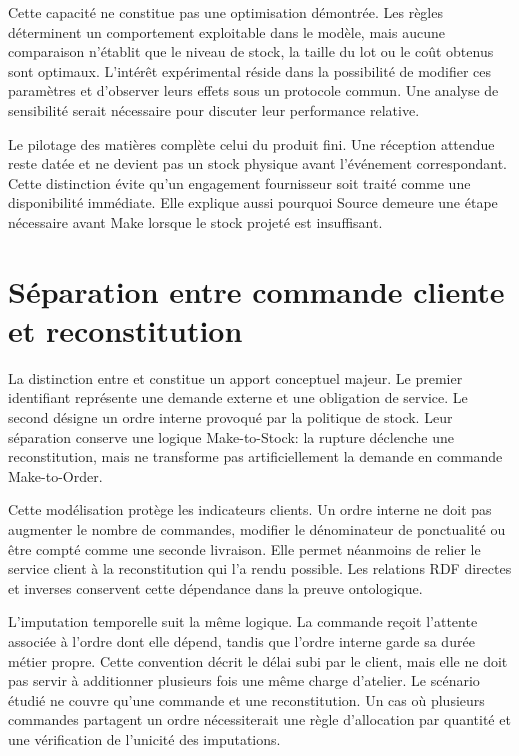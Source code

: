 Cette capacité ne constitue pas une optimisation démontrée. Les règles déterminent un comportement exploitable dans le modèle, mais aucune comparaison n'établit que le niveau de stock, la taille du lot ou le coût obtenus sont optimaux. L'intérêt expérimental réside dans la possibilité de modifier ces paramètres et d'observer leurs effets sous un protocole commun. Une analyse de sensibilité serait nécessaire pour discuter leur performance relative.

Le pilotage des matières complète celui du produit fini. Une réception attendue reste datée et ne devient pas un stock physique avant l'événement correspondant. Cette distinction évite qu'un engagement fournisseur soit traité comme une disponibilité immédiate. Elle explique aussi pourquoi Source demeure une étape nécessaire avant Make lorsque le stock projeté est insuffisant.

\section{Séparation entre commande cliente et reconstitution}

La distinction entre  et  constitue un apport conceptuel majeur. Le premier identifiant représente une demande externe et une obligation de service. Le second désigne un ordre interne provoqué par la politique de stock. Leur séparation conserve une logique Make-to-Stock: la rupture déclenche une reconstitution, mais ne transforme pas artificiellement la demande en commande Make-to-Order.

Cette modélisation protège les indicateurs clients. Un ordre interne ne doit pas augmenter le nombre de commandes, modifier le dénominateur de ponctualité ou être compté comme une seconde livraison. Elle permet néanmoins de relier le service client à la reconstitution qui l'a rendu possible. Les relations RDF directes et inverses conservent cette dépendance dans la preuve ontologique.

L'imputation temporelle suit la même logique. La commande reçoit l'attente associée à l'ordre dont elle dépend, tandis que l'ordre interne garde sa durée métier propre. Cette convention décrit le délai subi par le client, mais elle ne doit pas servir à additionner plusieurs fois une même charge d'atelier. Le scénario étudié ne couvre qu'une commande et une reconstitution. Un cas où plusieurs commandes partagent un ordre nécessiterait une règle d'allocation par quantité et une vérification de l'unicité des imputations.

